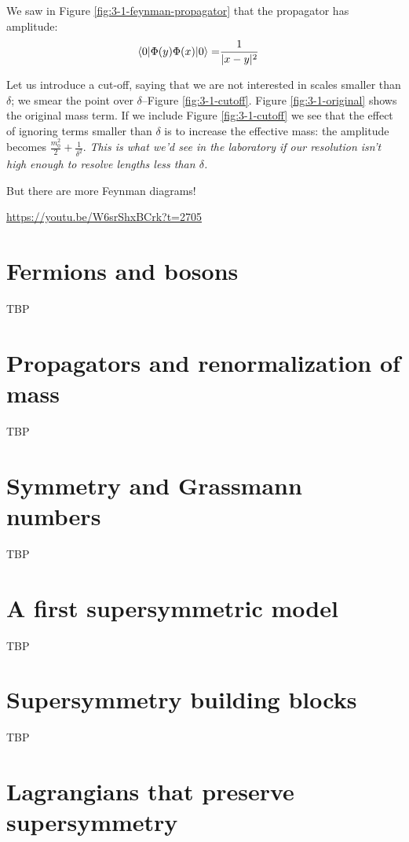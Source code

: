 \documentclass[]{article}
\begin{document}
We saw in Figure \ref{fig:3-1-feynman-propagator} that the propagator has amplitude:
\begin{align*}
	\braket{0|\Phi(y)\Phi(x)|0}=&\frac{1}{|x-y|^2}
\end{align*}

Let us introduce a cut-off, saying that we are not interested in scales smaller than $\delta$; we smear the point over $\delta$--Figure \ref{fig:3-1-cutoff}. Figure \ref{fig:3-1-original} shows the original mass term. If we include Figure \ref{fig:3-1-cutoff} we see that the effect of ignoring terms smaller than $\delta$ is to increase the effective mass: the amplitude becomes $\frac{m_0^2}{2}+\frac{1}{\delta^2}$.  \emph{This is what we'd see in the laboratory if our resolution isn't high enough to resolve lengths less than $\delta$.}  

But there are more Feynman diagrams!

\url{https://youtu.be/W6srShxBCrk?t=2705}
	
\section{Fermions and bosons}

TBP

\section{Propagators and renormalization of mass}

TBP

\section{Symmetry and Grassmann numbers}

TBP

\section{A first supersymmetric model}

TBP

\section{Supersymmetry building blocks}

TBP

\section{Lagrangians that preserve supersymmetry}
\end{document}

